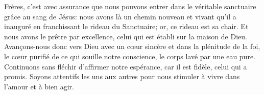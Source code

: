 Frères, c’est avec assurance
		que nous pouvons entrer dans le véritable sanctuaire
		grâce au sang de Jésus:
	nous avons là un chemin nouveau et vivant qu’il a inauguré
		en franchissant le rideau du Sanctuaire;
	or, ce rideau est sa chair.
Et nous avons le prêtre par excellence,
	celui qui est établi sur la maison de Dieu.
Avançons-nous donc vers Dieu avec un cœur sincère
		et dans la plénitude de la foi,
	le cœur purifié de ce qui souille notre conscience,
	le corps lavé par une eau pure.
Continuons sans fléchir d’affirmer notre espérance,
	car il est fidèle, celui qui a promis.
Soyons attentifs les uns aux autres
	pour nous stimuler à vivre dans l’amour et à bien agir.